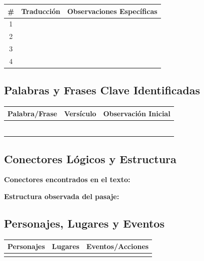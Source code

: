\documentclass[11pt,a4paper]{article}
\begin{document}
\begin{tabularx}{\textwidth}{|c|X|X|}
\hline
\textbf{\#} & \textbf{Traducción} & \textbf{Observaciones Específicas} \\
\hline
1 & \underline{\hspace{4cm}} & \\[1.5cm]
\hline
2 & \underline{\hspace{4cm}} & \\[1.5cm]
\hline
3 & \underline{\hspace{4cm}} & \\[1.5cm]
\hline
4 & \underline{\hspace{4cm}} & \\[1.5cm]
\hline
\end{tabularx}

\subsection{Palabras y Frases Clave Identificadas}

\begin{tabularx}{\textwidth}{|X|X|X|}
\hline
\textbf{Palabra/Frase} & \textbf{Versículo} & \textbf{Observación Inicial} \\
\hline
& & \\[1cm]
\hline
& & \\[1cm]
\hline
& & \\[1cm]
\hline
& & \\[1cm]
\hline
& & \\[1cm]
\hline
& & \\[1cm]
\hline
\end{tabularx}

\subsection{Conectores Lógicos y Estructura}

\textbf{Conectores encontrados en el texto:}
\vspace{2cm}

\textbf{Estructura observada del pasaje:}
\vspace{3cm}

\subsection{Personajes, Lugares y Eventos}

\begin{tabularx}{\textwidth}{|X|X|X|}
\hline
\textbf{Personajes} & \textbf{Lugares} & \textbf{Eventos/Acciones} \\
\hline
& & \\[2cm]
\hline
\end{tabularx}
\end{document}
